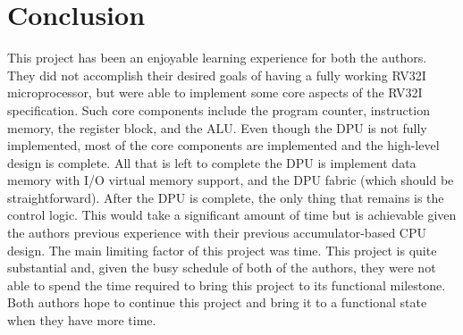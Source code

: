 \documentclass[lettersize,journal]{IEEEtran}
\begin{document}
\section{Conclusion}
This project has been an enjoyable learning experience for both the authors.
They did not accomplish their desired goals of having a fully working RV32I microprocessor, but were able to implement some core aspects of the RV32I specification.
Such core components include the program counter, instruction memory, the register block, and the ALU.
Even though the DPU is not fully implemented, most of the core components are implemented and the high-level design is complete.
All that is left to complete the DPU is implement data memory with I/O virtual memory support, and the DPU fabric (which should be straightforward).
After the DPU is complete, the only thing that remains is the control logic.
This would take a significant amount of time but is achievable given the authors previous experience with their previous accumulator-based CPU design.
The main limiting factor of this project was time.
This project is quite substantial and, given the busy schedule of both of the authors, they were not able to spend the time required to bring this project to its functional milestone.
Both authors hope to continue this project and bring it to a functional state when they have more time.
\end{document}
